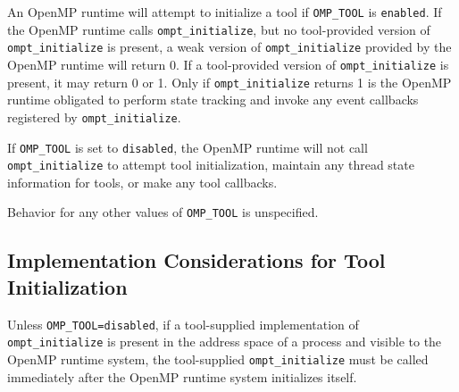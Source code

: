 \documentclass{article}
\begin{document}
\sloppy
An OpenMP runtime will attempt to initialize  a tool  if  \verb|OMP_TOOL| is  \verb|enabled|. If the OpenMP runtime calls \verb|ompt_initialize|, but no tool-provided version of \verb|ompt_initialize| is present,
a weak version of \verb|ompt_initialize| provided by the OpenMP runtime  will return 0. 
If a tool-provided version of \verb|ompt_initialize| is present, it may return 0 or 1. Only if \verb|ompt_initialize|  returns 1 is  the OpenMP runtime obligated to perform state tracking and invoke any event callbacks registered by \verb|ompt_initialize|.

If \verb|OMP_TOOL| is set to \verb|disabled|, 
the OpenMP runtime will not call  \verb|ompt_initialize| to attempt tool initialization, maintain any thread state information for tools, or make any tool callbacks.

Behavior for any other values of \verb|OMP_TOOL| is unspecified.

\subsection{Implementation Considerations for Tool  Initialization}

Unless {\tt OMP\_TOOL=disabled}, if a tool-supplied implementation of \verb|ompt_initialize| is present in the address space of a process and visible to the OpenMP runtime system, 
the tool-supplied \verb|ompt_initialize|  must be called immediately after the OpenMP runtime system initializes itself. 
\end{document}
